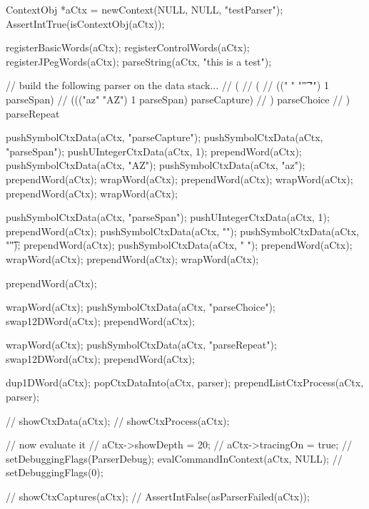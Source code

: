 

\startCTest
  ContextObj *aCtx = newContext(NULL, NULL, "testParser");
  AssertIntTrue(isContextObj(aCtx));
  
  registerBasicWords(aCtx);
  registerControlWords(aCtx);
  registerJPegWords(aCtx);
  parseString(aCtx, "this is a test");

  // build the following parser on the data stack...
  // ( 
  //   (
  //     ((" " "\t" "\n") 1 parseSpan)
  //     ((("az" "AZ") 1 parseSpan) parseCapture)
  //   ) parseChoice
  // ) parseRepeat

  pushSymbolCtxData(aCtx, "parseCapture");
  pushSymbolCtxData(aCtx, "parseSpan");
  pushUIntegerCtxData(aCtx, 1);
  prependWord(aCtx);
  pushSymbolCtxData(aCtx, "AZ");
  pushSymbolCtxData(aCtx, "az");
  prependWord(aCtx);
  wrapWord(aCtx);
  prependWord(aCtx);
  wrapWord(aCtx);
  prependWord(aCtx);
  wrapWord(aCtx);
  
  pushSymbolCtxData(aCtx, "parseSpan");
  pushUIntegerCtxData(aCtx, 1);
  prependWord(aCtx);
  pushSymbolCtxData(aCtx, "\n");
  pushSymbolCtxData(aCtx, "\t");
  prependWord(aCtx);
  pushSymbolCtxData(aCtx, " ");
  prependWord(aCtx);
  wrapWord(aCtx);
  prependWord(aCtx);
  wrapWord(aCtx);
  
  prependWord(aCtx);
  
  wrapWord(aCtx);
  pushSymbolCtxData(aCtx, "parseChoice");
  swap12DWord(aCtx);
  prependWord(aCtx);
  
  wrapWord(aCtx);
  pushSymbolCtxData(aCtx, "parseRepeat");
  swap12DWord(aCtx);
  prependWord(aCtx);
  
  dup1DWord(aCtx);
  popCtxDataInto(aCtx, parser);
  prependListCtxProcess(aCtx, parser);
  
//  showCtxData(aCtx);
//  showCtxProcess(aCtx);
  
  // now evaluate it
//  aCtx->showDepth = 20;
//  aCtx->tracingOn = true;
//  setDebuggingFlags(ParserDebug);
  evalCommandInContext(aCtx, NULL);
//  setDebuggingFlags(0);
  
//  showCtxCaptures(aCtx);
//  AssertIntFalse(asParserFailed(aCtx));
\stopCTest
\stopTestCase
\stopTestSuite
